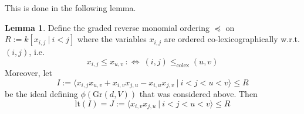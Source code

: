 \documentclass{scrartcl}
\newcommand{\Gr}{\mathrm{Gr}}
\theoremstyle{definition}
\newtheorem{lemma}[definition]{Lemma}
\begin{document}
This is done in the following lemma.
\begin{lemma}
    \label{prop:leading_term_ideal_grassmanian}
    Define the graded reverse monomial ordering $\preceq$ on $R := k[x_{i, j} \ | \ i < j]$ where the variables $x_{i, j}$ are ordered co-lexicographically w.r.t. $(i, j)$, i.e.
    \begin{equation*}
        x_{i, j} \leq x_{u, v} \ :\Leftrightarrow \ (i, j) \leq_{\text{colex}} (u, v)
    \end{equation*}
    Moreover, let
    \begin{equation*}
        I := \langle x_{i, j}x_{u, v} + x_{i, v}x_{j, u} - x_{i, u}x_{j, v} \ | \ i < j < u < v \rangle \leq R
    \end{equation*}
    be the ideal defining $\phi(\Gr(d, V))$ that was considered above. Then
    \begin{equation*}
        \mathrm{lt}(I) = J := \langle x_{i, v} x_{j, u} \ | \ i < j < u < v \rangle \leq R
    \end{equation*}
\end{lemma}
\end{document}
